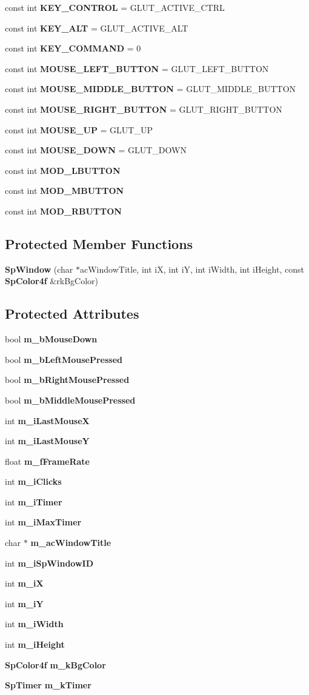 \begin{CompactItemize}
const int {\bf KEY\_\-CONTROL} = GLUT\_\-ACTIVE\_\-CTRL
\item 
const int {\bf KEY\_\-ALT} = GLUT\_\-ACTIVE\_\-ALT
\item 
const int {\bf KEY\_\-COMMAND} = 0
\item 
const int {\bf MOUSE\_\-LEFT\_\-BUTTON} = GLUT\_\-LEFT\_\-BUTTON
\item 
const int {\bf MOUSE\_\-MIDDLE\_\-BUTTON} = GLUT\_\-MIDDLE\_\-BUTTON
\item 
const int {\bf MOUSE\_\-RIGHT\_\-BUTTON} = GLUT\_\-RIGHT\_\-BUTTON
\item 
const int {\bf MOUSE\_\-UP} = GLUT\_\-UP
\item 
const int {\bf MOUSE\_\-DOWN} = GLUT\_\-DOWN
\item 
const int {\bf MOD\_\-LBUTTON}
\item 
const int {\bf MOD\_\-MBUTTON}
\item 
const int {\bf MOD\_\-RBUTTON}
\end{CompactItemize}
\subsection*{Protected Member Functions}
\begin{CompactItemize}
\item 
{\bf Sp\-Window} (char $\ast$ac\-Window\-Title, int i\-X, int i\-Y, int i\-Width, int i\-Height, const {\bf Sp\-Color4f} \&rk\-Bg\-Color)
\end{CompactItemize}
\subsection*{Protected Attributes}
\begin{CompactItemize}
\item 
bool {\bf m\_\-b\-Mouse\-Down}
\item 
bool {\bf m\_\-b\-Left\-Mouse\-Pressed}
\item 
bool {\bf m\_\-b\-Right\-Mouse\-Pressed}
\item 
bool {\bf m\_\-b\-Middle\-Mouse\-Pressed}
\item 
int {\bf m\_\-i\-Last\-Mouse\-X}
\item 
int {\bf m\_\-i\-Last\-Mouse\-Y}
\item 
float {\bf m\_\-f\-Frame\-Rate}
\item 
int {\bf m\_\-i\-Clicks}
\item 
int {\bf m\_\-i\-Timer}
\item 
int {\bf m\_\-i\-Max\-Timer}
\item 
char $\ast$ {\bf m\_\-ac\-Window\-Title}
\item 
int {\bf m\_\-i\-Sp\-Window\-ID}
\item 
int {\bf m\_\-i\-X}
\item 
int {\bf m\_\-i\-Y}
\item 
int {\bf m\_\-i\-Width}
\item 
int {\bf m\_\-i\-Height}
\item 
{\bf Sp\-Color4f} {\bf m\_\-k\-Bg\-Color}
\item 
{\bf Sp\-Timer} {\bf m\_\-k\-Timer}
\end{CompactItemize}
